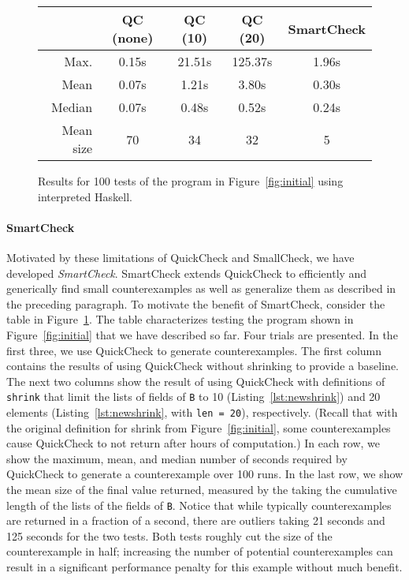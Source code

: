 \documentclass[9pt]{sigplanconf}
\newcommand{\ttp}[1]{\texttt{#1}}
\begin{document}
\begin{figure}[ht]
\scriptsize
  \begin{center}
    \begin{tabular}{|r||c|c|c|c|}
\hline 
 & QC (none) & QC (10) & QC (20) & SmartCheck \\      
\hline \hline 
Max.  & 0.15s & 21.51s & 125.37s & 1.96s\\
\hline
Mean  & 0.07s & 1.21s & 3.80s & 0.30s\\
\hline
Median & 0.07s & 0.48s & 0.52s & 0.24s\\
\hline
Mean size & 70 & 34 & 32 & 5\\
\hline
    \end{tabular}
  \end{center}
  \caption{Results for 100 tests of the program in Figure~\ref{fig:initial}
    using interpreted Haskell.}
  \label{fig:results}
\end{figure}


\paragraph{SmartCheck}
Motivated by these limitations of QuickCheck and SmallCheck, we have developed
\emph{SmartCheck}.  SmartCheck extends QuickCheck to efficiently and generically
find small counterexamples as well as generalize them as described in the
preceding paragraph.  To motivate the benefit of SmartCheck, consider the table
in Figure~\ref{fig:results}.  The table characterizes testing the program shown
in Figure~\ref{fig:initial} that we have described so far.  Four trials are
presented.  In the first three, we use QuickCheck to generate counterexamples.
The first column contains the results of using QuickCheck without shrinking to
provide a baseline.  The next two columns show the result of using QuickCheck
with definitions of \ttp{shrink} that limit the lists of fields of \ttp{B} to 10
(Listing~\ref{lst:newshrink}) and 20 elements (Listing~\ref{lst:newshrink}, with
\ttp{len = 20}), respectively.  (Recall that with the original definition for
shrink from Figure~\ref{fig:initial}, some counterexamples cause QuickCheck to
not return after hours of computation.)  In each row, we show the maximum, mean,
and median number of seconds required by QuickCheck to generate a counterexample
over 100 runs.  In the last row, we show the mean size of the final value
returned, measured by the taking the cumulative length of the lists of the
fields of \ttp{B}.  Notice that while typically counterexamples are returned in
a fraction of a second, there are outliers taking 21 seconds and 125 seconds for
the two tests.  Both tests roughly cut the size of the counterexample in half;
increasing the number of potential counterexamples can result in a significant
performance penalty for this example without much benefit.
\end{document}
